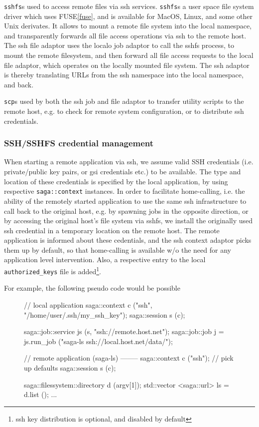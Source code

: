 \documentclass[conference,final]{IEEEtran}
\newcommand{\upp}{\vspace*{-0.5em}}
\newcommand{\T}[1]{\texttt{#1}}
\newcommand{\scp}[1]{\texttt{scp}}
\newcommand{\sshfs}[1]{\texttt{sshfs}}
\begin{document}
  \sshfs is used to access remote files via ssh services.  \sshfs is a
  user space file system driver which uses FUSE\ref{fuse}, and is
  available for MacOS, Linux, and some other Unix derivates.  It
  allows to mount a remote file system into the local namespace, and
  transparently forwards all file access operations via ssh to the
  remote host.  The ssh file adaptor uses the localo job adaptor to
  call the sshfs process, to mount the remote filesystem, and then
  forward all file access requests to the local file adaptor, which
  operates on the locally mounted file system.  The ssh adaptor is
  thereby translating URLs from the ssh namespace into the local
  namespace, and back.

  \scp is used by both the ssh job and file adaptor to transfer
  utility scripts to the remote host, e.g. to check for remote system
  configuration, or to distribute ssh credentials.

  
  \subsubsection{SSH/SSHFS credential management}

   When starting a remote application via ssh, we assume valid SSH
   credentials (i.e. private/public key pairs, or gsi credentials
   etc.) to be available.  The type and location of these credentials
   is specified by the local application, by using respective
   \T{saga::context} instances.  In order to facilitate home-calling,
   i.e. the ability of the remotely started application to use the
   same ssh infrastructure to call back to the original host, e.g. by
   spawning jobs in the opposite direction, or by accessing the
   original host's file system via sshfs, we install the originally
   used ssh credential in a temporary location on the remote host.
   The remote application is informed about these cedentials, and the
   ssh context adaptor picks them up by default, so that home-calling
   is available w/o the need for any application level intervention.
   Also, a respective entry to the local \T{authorized\_keys} file is
   added\footnote{ssh key distribution is optional, and disabled by
   default}.

   For example, the following pseudo code would be possible

\begin{figure}[!ht]
\upp 
 \begin{center}
  \begin{mycode}[label=Stuff]
   { // local application 
   saga::context c ("ssh", "/home/user/.ssh/my_ssh_key");
   saga::session s (c);

   saga::job::service js (s, "ssh://remote.host.net");
   saga::job::job j = js.run_job 
                ("saga-ls ssh://local.host.net/data/");

   // remote application (saga-ls) --------
   saga::context c ("ssh"); // pick up defaults
   saga::session s (c);

   saga::filessystem::directory d (argv[1]);
   std::vector <saga::url> ls = d.list ();
   ... 
}
  \end{mycode}
  \caption{}
 \end{center}
\upp
\end{figure}
\end{document}
